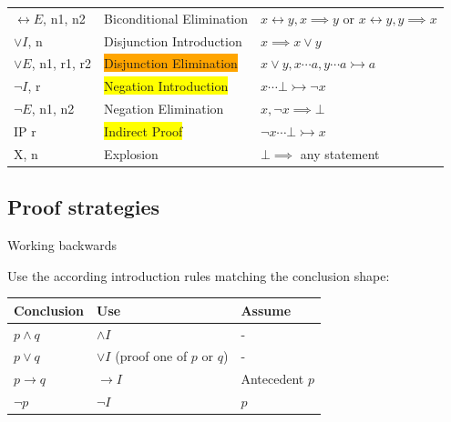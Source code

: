 \documentclass{article}
\begin{document}
\begin{definition}
\begin{tabular}{l|lp{8cm}}
        $\leftrightarrow E$, n1, n2 & Biconditional Elimination                     & $x \leftrightarrow y, x \implies y$ or $x \leftrightarrow y, y \implies x$ \\
        $\lor I$, n                 & Disjunction Introduction                      & $x \implies x \lor y$                                                      \\
        $\lor E$, n1, r1, r2        & \colorbox{orange}{Disjunction Elimination}    & $x \lor y, x \cdots a, y \cdots a \rightarrowtail a$                       \\
        $\neg I$, r                 & \colorbox{yellow}{Negation Introduction}      & $x \cdots \bot \rightarrowtail \neg x$                                     \\
        $\neg E$, n1, n2            & Negation Elimination                          & $x, \neg x \implies \bot$                                                  \\
        IP r                        & \colorbox{yellow}{Indirect Proof}             & $\neg x \cdots \bot \rightarrowtail x$                                     \\
        X, n                        & Explosion                                     & $\bot \implies$ any statement                                              \\
    \end{tabular}
\end{definition}


\subsection{Proof strategies}

\begin{theorem}
    {Working backwards}

    Use the according introduction rules matching the conclusion shape:

    \begin{tabular}{l|l|l}
        \textbf{Conclusion} & \textbf{Use}                       & \textbf{Assume} \\
        \hline
        $p \land q$         & $\land I$                          & -               \\
        $p \lor q$          & $\lor I$ (proof one of $p$ or $q$) & -               \\
        $p \rightarrow q$   & $\rightarrow I$                    & Antecedent $p$  \\
        $\neg p$            & $\neg I$                           & $p$             \\
    \end{tabular}
\end{theorem}
\end{document}
